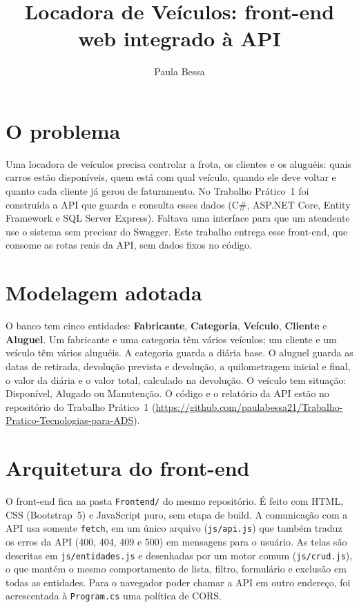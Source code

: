 \documentclass[12pt]{article}
\title{Locadora de Veículos: front-end web integrado à API}
\author{Paula Bessa\inst{1}}
\begin{document}
\maketitle

\section{O problema}

Uma locadora de veículos precisa controlar a frota, os clientes e os aluguéis: quais carros estão
disponíveis, quem está com qual veículo, quando ele deve voltar e quanto cada cliente já gerou de
faturamento. No Trabalho Prático~1 foi construída a API que guarda e consulta esses dados
(C\#, ASP.NET Core, Entity Framework e SQL Server Express). Faltava uma interface para que um
atendente use o sistema sem precisar do Swagger. Este trabalho entrega esse front-end, que consome
as rotas reais da API, sem dados fixos no código.

\section{Modelagem adotada}

O banco tem cinco entidades: \textbf{Fabricante}, \textbf{Categoria}, \textbf{Veículo},
\textbf{Cliente} e \textbf{Aluguel}. Um fabricante e uma categoria têm vários veículos; um cliente e
um veículo têm vários aluguéis. A categoria guarda a diária base. O aluguel guarda as datas de
retirada, devolução prevista e devolução, a quilometragem inicial e final, o valor da diária e o
valor total, calculado na devolução. O veículo tem situação: Disponível, Alugado ou Manutenção.
O código e o relatório da API estão no repositório do Trabalho Prático~1 (\url{https://github.com/paulabessa21/Trabalho-Pratico-Tecnologias-para-ADS}).

\section{Arquitetura do front-end}

O front-end fica na pasta \texttt{Frontend/} do mesmo repositório. É feito com HTML, CSS (Bootstrap~5)
e JavaScript puro, sem etapa de build. A comunicação com a API usa somente \texttt{fetch}, em um único
arquivo (\texttt{js/api.js}) que também traduz os erros da API (400, 404, 409 e 500) em mensagens
para o usuário. As telas são descritas em \texttt{js/entidades.js} e desenhadas por um motor comum
(\texttt{js/crud.js}), o que mantém o mesmo comportamento de lista, filtro, formulário e exclusão
em todas as entidades. Para o navegador poder chamar a API em outro endereço, foi acrescentada à
\texttt{Program.cs} uma política de CORS.
\end{document}
